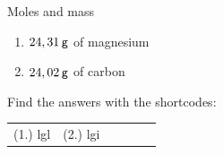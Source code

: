 \begin{exercises}{Moles and mass
      }
\begin{enumerate}[noitemsep, label=\textbf{\arabic*}. ]
\begin{enumerate}[noitemsep, label=\textbf{\alph*}. ]
\label{m38717*uid7}\item $24,31\phantom{\rule{2pt}{0ex}}\mathsf{g}$ of magnesium
\label{m38717*uid8}\item $24,02\phantom{\rule{2pt}{0ex}}\mathsf{g}$ of carbon
\end{enumerate}
                \end{enumerate}
    \label{m38717*cid3}
\par {} Find the answers with the shortcodes:
 \par \begin{tabular}[h]{cccccc}
 (1.) lgl  &  (2.) lgi  & \end{tabular}
\end{exercises}
